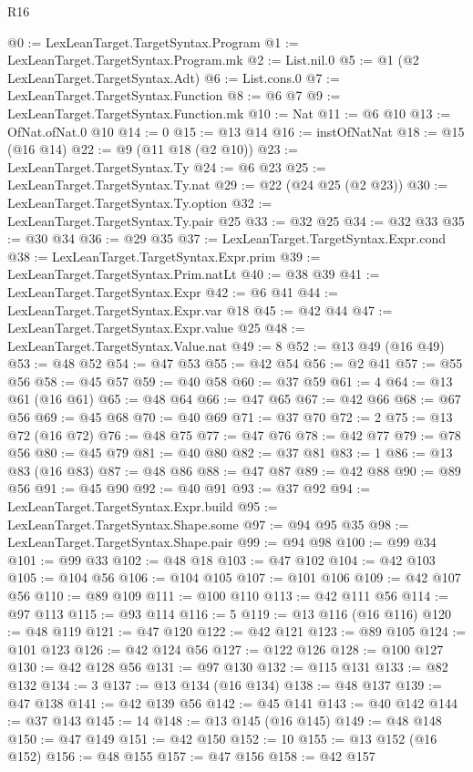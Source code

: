 \begin{lexlean}{R16}
\begin{coremodule}
@0 := LexLeanTarget.TargetSyntax.Program
@1 := LexLeanTarget.TargetSyntax.Program.mk
@2 := List.nil.{0}
@5 := @1 (@2 LexLeanTarget.TargetSyntax.Adt)
@6 := List.cons.{0}
@7 := LexLeanTarget.TargetSyntax.Function
@8 := @6 @7
@9 := LexLeanTarget.TargetSyntax.Function.mk
@10 := Nat
@11 := @6 @10
@13 := OfNat.ofNat.{0} @10
@14 := 0
@15 := @13 @14
@16 := instOfNatNat
@18 := @15 (@16 @14)
@22 := @9 (@11 @18 (@2 @10))
@23 := LexLeanTarget.TargetSyntax.Ty
@24 := @6 @23
@25 := LexLeanTarget.TargetSyntax.Ty.nat
@29 := @22 (@24 @25 (@2 @23))
@30 := LexLeanTarget.TargetSyntax.Ty.option
@32 := LexLeanTarget.TargetSyntax.Ty.pair @25
@33 := @32 @25
@34 := @32 @33
@35 := @30 @34
@36 := @29 @35
@37 := LexLeanTarget.TargetSyntax.Expr.cond
@38 := LexLeanTarget.TargetSyntax.Expr.prim
@39 := LexLeanTarget.TargetSyntax.Prim.natLt
@40 := @38 @39
@41 := LexLeanTarget.TargetSyntax.Expr
@42 := @6 @41
@44 := LexLeanTarget.TargetSyntax.Expr.var @18
@45 := @42 @44
@47 := LexLeanTarget.TargetSyntax.Expr.value @25
@48 := LexLeanTarget.TargetSyntax.Value.nat
@49 := 8
@52 := @13 @49 (@16 @49)
@53 := @48 @52
@54 := @47 @53
@55 := @42 @54
@56 := @2 @41
@57 := @55 @56
@58 := @45 @57
@59 := @40 @58
@60 := @37 @59
@61 := 4
@64 := @13 @61 (@16 @61)
@65 := @48 @64
@66 := @47 @65
@67 := @42 @66
@68 := @67 @56
@69 := @45 @68
@70 := @40 @69
@71 := @37 @70
@72 := 2
@75 := @13 @72 (@16 @72)
@76 := @48 @75
@77 := @47 @76
@78 := @42 @77
@79 := @78 @56
@80 := @45 @79
@81 := @40 @80
@82 := @37 @81
@83 := 1
@86 := @13 @83 (@16 @83)
@87 := @48 @86
@88 := @47 @87
@89 := @42 @88
@90 := @89 @56
@91 := @45 @90
@92 := @40 @91
@93 := @37 @92
@94 := LexLeanTarget.TargetSyntax.Expr.build
@95 := LexLeanTarget.TargetSyntax.Shape.some
@97 := @94 @95 @35
@98 := LexLeanTarget.TargetSyntax.Shape.pair
@99 := @94 @98
@100 := @99 @34
@101 := @99 @33
@102 := @48 @18
@103 := @47 @102
@104 := @42 @103
@105 := @104 @56
@106 := @104 @105
@107 := @101 @106
@109 := @42 @107 @56
@110 := @89 @109
@111 := @100 @110
@113 := @42 @111 @56
@114 := @97 @113
@115 := @93 @114
@116 := 5
@119 := @13 @116 (@16 @116)
@120 := @48 @119
@121 := @47 @120
@122 := @42 @121
@123 := @89 @105
@124 := @101 @123
@126 := @42 @124 @56
@127 := @122 @126
@128 := @100 @127
@130 := @42 @128 @56
@131 := @97 @130
@132 := @115 @131
@133 := @82 @132
@134 := 3
@137 := @13 @134 (@16 @134)
@138 := @48 @137
@139 := @47 @138
@141 := @42 @139 @56
@142 := @45 @141
@143 := @40 @142
@144 := @37 @143
@145 := 14
@148 := @13 @145 (@16 @145)
@149 := @48 @148
@150 := @47 @149
@151 := @42 @150
@152 := 10
@155 := @13 @152 (@16 @152)
@156 := @48 @155
@157 := @47 @156
@158 := @42 @157

\end{coremodule}
\end{lexlean}
